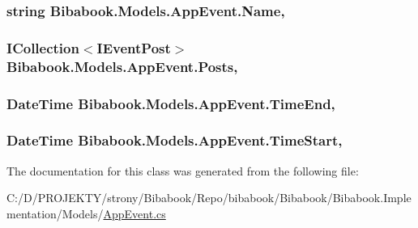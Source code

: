\subsubsection[{Name}]{\setlength{\rightskip}{0pt plus 5cm}string Bibabook.\+Models.\+App\+Event.\+Name\hspace{0.3cm}{\ttfamily [get]}, {\ttfamily [set]}}\label{class_bibabook_1_1_models_1_1_app_event_ae0581126283337c793d4397afd74dc05}
\hypertarget{class_bibabook_1_1_models_1_1_app_event_a59ef083c6f4f43c0f589cb248eea0b67}{}
\subsubsection[{Posts}]{\setlength{\rightskip}{0pt plus 5cm}I\+Collection$<$I\+Event\+Post$>$ Bibabook.\+Models.\+App\+Event.\+Posts\hspace{0.3cm}{\ttfamily [get]}, {\ttfamily [set]}}\label{class_bibabook_1_1_models_1_1_app_event_a59ef083c6f4f43c0f589cb248eea0b67}
\hypertarget{class_bibabook_1_1_models_1_1_app_event_a121f344bd075a3a6c50b18d85743e73a}{}
\subsubsection[{Time\+End}]{\setlength{\rightskip}{0pt plus 5cm}Date\+Time Bibabook.\+Models.\+App\+Event.\+Time\+End\hspace{0.3cm}{\ttfamily [get]}, {\ttfamily [set]}}\label{class_bibabook_1_1_models_1_1_app_event_a121f344bd075a3a6c50b18d85743e73a}
\hypertarget{class_bibabook_1_1_models_1_1_app_event_aaaa7d9529bde8734f6aaece0f8d6d0a4}{}
\subsubsection[{Time\+Start}]{\setlength{\rightskip}{0pt plus 5cm}Date\+Time Bibabook.\+Models.\+App\+Event.\+Time\+Start\hspace{0.3cm}{\ttfamily [get]}, {\ttfamily [set]}}\label{class_bibabook_1_1_models_1_1_app_event_aaaa7d9529bde8734f6aaece0f8d6d0a4}


The documentation for this class was generated from the following file\+:\begin{DoxyCompactItemize}
\item 
C\+:/\+D/\+P\+R\+O\+J\+E\+K\+T\+Y/strony/\+Bibabook/\+Repo/bibabook/\+Bibabook/\+Bibabook.\+Implementation/\+Models/\hyperlink{_app_event_8cs}{App\+Event.\+cs}\end{DoxyCompactItemize}
